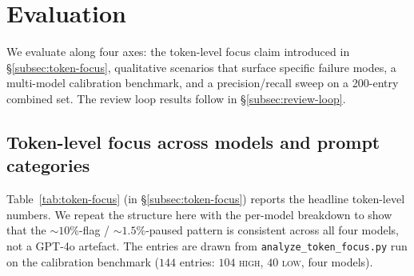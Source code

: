 \section{Evaluation}
\label{sec:evaluation}

We evaluate \eps along four axes: the token-level focus claim
introduced in \S\ref{subsec:token-focus}, qualitative scenarios that
surface specific failure modes, a multi-model calibration benchmark,
and a precision/recall sweep on a 200-entry combined set. The review
loop results follow in \S\ref{subsec:review-loop}.

\subsection{Token-level focus across models and prompt categories}
\label{subsec:token-eval}

Table~\ref{tab:token-focus} (in \S\ref{subsec:token-focus}) reports
the headline token-level numbers. We repeat the structure here with
the per-model breakdown to show that the $\sim 10\%$-flag /
$\sim 1.5\%$-paused pattern is consistent across all four models, not
a GPT-4o artefact. The entries are drawn from
\texttt{analyze\_token\_focus.py} run on the calibration benchmark
($144$ entries: $104$ \textsc{high}, $40$ \textsc{low}, four models).

